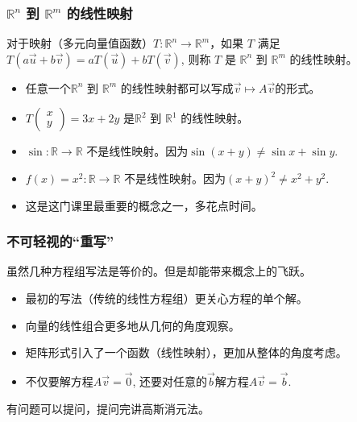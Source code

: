 \documentclass[CJK]{beamer}
\begin{document}
\begin{frame}
\frametitle{$\mathbb R ^n$ 到 $\mathbb R ^m$ 的线性映射}

对于映射（多元向量值函数）$T:\mathbb R ^n\to \mathbb R ^m$，如果 $T$ 满足 $T(a\vec{u}+b\vec{v}) = aT(\vec{u})+bT(\vec{v})$, 则称 $T$ 是 $\mathbb R ^n$ 到 $ \mathbb R ^m$ 的\alert{线性映射}。

\begin{itemize}
    \item 任意一个$\mathbb R ^n$ 到 $\mathbb R ^m$ 的线性映射都可以写成$\vec{v}\mapsto A\vec{v}$的形式。
    \item $T\begin{pmatrix} x \\ y \end{pmatrix} = 3x + 2y$ 是$\mathbb R ^2$ 到 $\mathbb R ^1$ 的线性映射。
    \item $\sin : \mathbb R \to \mathbb R$ \alert{不是}线性映射。因为$\sin(x+y)\neq \sin x + \sin y$.
    \item $f(x) = x^2 : \mathbb R \to \mathbb R$ \alert{不是}线性映射。因为$(x+y)^2\neq x^2 + y^2$.
    \item 这是这门课里\alert{最重要的概念}之一，多花点时间。
\end{itemize}


\end{frame}

\begin{frame}
\frametitle{不可轻视的``重写''}
虽然几种方程组写法是\alert{等价}的。但是却能带来概念上的飞跃。

\begin{itemize}
    \item 最初的写法（传统的线性方程组）更关心方程的\alert{单个解}。
    \item 向量的线性组合更多地从\alert{几何的角度}观察。
    \item 矩阵形式引入了一个\alert{函数（线性映射）}，更加从整体的角度考虑。
    \item 不仅要解方程$A\vec{v} = \vec{0}$, 还要对任意的$\vec{b}$解方程$A\vec{v} = \vec{b}$.
\end{itemize}

\end{frame}

\begin{frame}
	有问题可以提问，提问完讲\alert{高斯消元法}。
\end{frame}
\end{document}

